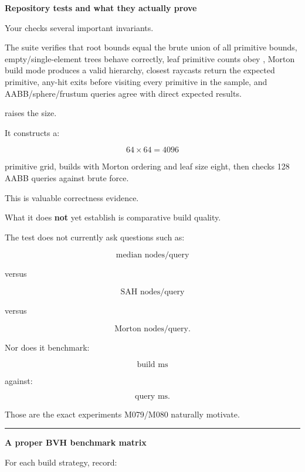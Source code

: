 \textbf{Repository tests and what they actually prove}

Your  checks several important invariants.

The suite verifies that root bounds equal the brute union of all primitive bounds, empty/single-element trees behave correctly, leaf primitive counts obey , Morton build mode produces a valid hierarchy, closest raycasts return the expected primitive, any-hit exits before visiting every primitive in the sample, and AABB/sphere/frustum queries agree with direct expected results.

 raises the size.

It constructs a:

\[
64\times64=4096
\]

primitive grid, builds with Morton ordering and leaf size eight, then checks 128 AABB queries against brute force.

This is valuable correctness evidence.

What it does \textbf{not} yet establish is comparative build quality.

The test does not currently ask questions such as:

\[
\text{median nodes/query}
\]

versus

\[
\text{SAH nodes/query}
\]

versus

\[
\text{Morton nodes/query}.
\]

Nor does it benchmark:

\[
\text{build ms}
\]

against:

\[
\text{query ms}.
\]

Those are the exact experiments M079/M080 naturally motivate.

\begin{center}\rule{0.5\linewidth}{0.5pt}\end{center}

\textbf{A proper BVH benchmark matrix}

For each build strategy, record:

